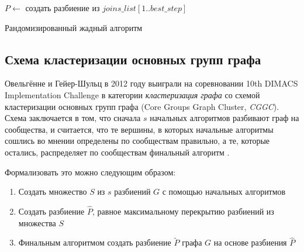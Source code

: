 \begin{algorithm}[h]
\BlankLine
$P \leftarrow $ создать разбиение из $joins\_list[1..best\_step]$\;
\BlankLine
\caption{Рандомизированный жадный алгоритм}
\label{alg:RG}
\end{algorithm}



\subsection{Схема кластеризации основных групп графа}
\label{subsec:ens}

Овельгённе и Гейер-Шульц в 2012 году выиграли на соревновании 10th DIMACS Implementation Challenge в категории \emph{кластеризация графа} со схемой кластеризации основных групп графа (Core Groups Graph Cluster, \emph{CGGC}). Схема заключается в том, что сначала $s$ начальных алгоритмов разбивают граф на сообщества, и считается, что те вершины, в которых начальные алгоритмы сошлись во мнении определены по сообществам правильно, а те, которые остались, распределяет по сообществам финальный алгоритм \cite{Ovelgoenne&Geyer-Schulz:2012b}.

Формализовать это можно следующим образом:
\begin{enumerate}
	\item Создать множество $S$ из $s$ разбиений $G$ с помощью начальных алгоритмов
	\item Создать разбиение $\hat{P}$, равное максимальному перекрытию разбиений из множества $S$
	\item Финальным алгоритмом создать разбиение $\widetilde{P}$ графа $G$ на основе разбиения $\hat{P}$
\end{enumerate}

